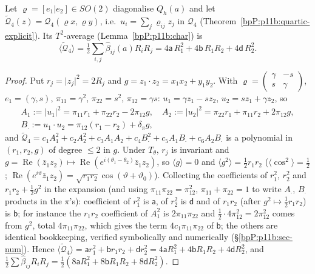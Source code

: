 \begin{proposition}\label{bpP:p11b:beta-formula}
Let $\varrho=[e_1|e_2]\in SO(2)$ diagonalise $Q_h(a)$ and let $\tilde{\mathcal Q}_4(z)=\mathcal Q_4(\varrho x,\varrho y)$, i.e.\ $u_i=\sum_j\varrho_{ij}z_j$ in $\mathcal Q_4$ (Theorem~\ref{bpP:p11b:quartic-explicit}). Its $T^2$-average (Lemma~\ref{bpP:p11b:char}) is
\[\langle\tilde{\mathcal Q}_4\rangle=\tfrac12\sum_{i,j}\hat\beta_{ij}(a)R_iR_j=4\mathsf a\,R_1^2+4\mathsf b\,R_1R_2+4\mathsf d\,R_2^2 .\]
\end{proposition}
\begin{proof}
\label{stepP:p11b:bf-gram} Put $r_j=\lvert z_j\rvert^2=2R_j$ and $g=z_1\cdot z_2=x_1x_2+y_1y_2$. With $\varrho=\begin{pmatrix}\gamma&-s\\s&\gamma\end{pmatrix}$, $e_1=(\gamma,s)$, $\pi_{11}=\gamma^2$, $\pi_{22}=s^2$, $\pi_{12}=\gamma s$: $u_1=\gamma z_1-sz_2$, $u_2=sz_1+\gamma z_2$, so
\begin{gather*}A_1:=\lvert u_1\rvert^2=\pi_{11}r_1+\pi_{22}r_2-2\pi_{12}g,\quad A_2:=\lvert u_2\rvert^2=\pi_{22}r_1+\pi_{11}r_2+2\pi_{12}g,\\ B_\cdot:=u_1\cdot u_2=\pi_{12}(r_1-r_2)+\delta_\pi g,\end{gather*}
and $\tilde{\mathcal Q}_4=c_1A_1^2+c_2A_2^2+c_3A_1A_2+c_4B_\cdot^2+c_5A_1B_\cdot+c_6A_2B_\cdot$ is a polynomial in $(r_1,r_2,g)$ of degree $\le2$ in $g$.
\label{stepP:p11b:bf-avg} Under $T_\theta$, $r_j$ is invariant and $g=\operatorname{Re}(\bar z_1z_2)\mapsto\operatorname{Re}(e^{i(\theta_1-\theta_2)}\bar z_1z_2)$, so $\langle g\rangle=0$ and $\langle g^2\rangle=\tfrac12r_1r_2$ ($\langle\cos^2\rangle=\tfrac12$; $\operatorname{Re}(e^{i\vartheta}\bar z_1z_2)=\sqrt{r_1r_2}\cos(\vartheta+\vartheta_0)$). Collecting the coefficients of $r_1^2$, $r_2^2$ and $r_1r_2+\tfrac12g^2$ in the expansion (and using $\pi_{11}\pi_{22}=\pi_{12}^2$, $\pi_{11}+\pi_{22}=1$ to write $A_\cdot$, $B_\cdot$ products in the $\pi$'s): coefficient of $r_1^2$ is $\mathsf a$, of $r_2^2$ is $\mathsf d$ and of $r_1r_2$ (after $g^2\mapsto\frac12r_1r_2$) is $\mathsf b$; for instance the $r_1r_2$ coefficient of $A_1^2$ is $2\pi_{11}\pi_{22}$ and $\tfrac12\cdot4\pi_{12}^2=2\pi_{12}^2$ comes from $g^2$, total $4\pi_{11}\pi_{22}$, which gives the term $4c_1\pi_{11}\pi_{22}$ of $\mathsf b$; the others are identical bookkeeping, verified symbolically and numerically (\S\ref{bpP:p11b:sec-num}). Hence $\langle\tilde{\mathcal Q}_4\rangle=\mathsf ar_1^2+\mathsf br_1r_2+\mathsf dr_2^2=4\mathsf aR_1^2+4\mathsf bR_1R_2+4\mathsf dR_2^2$, and $\tfrac12\sum\hat\beta_{ij}R_iR_j=\tfrac12(8\mathsf aR_1^2+8\mathsf bR_1R_2+8\mathsf dR_2^2)$.
\end{proof}

